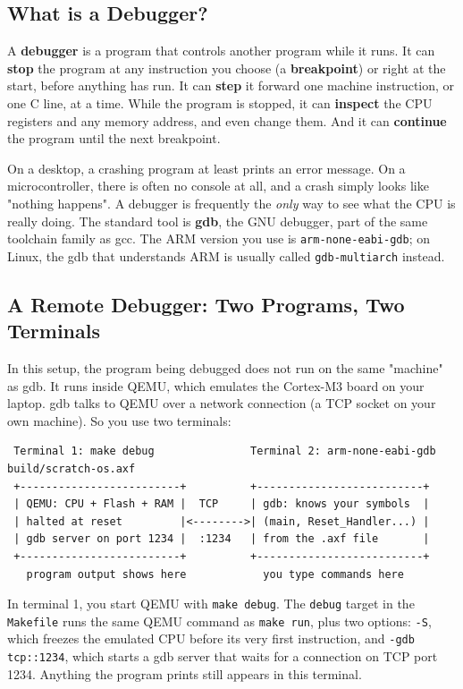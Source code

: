 \subsection{What is a Debugger?}
A \textbf{debugger} is a program that controls another program while it runs. It can \textbf{stop} the program at any instruction you choose (a \textbf{breakpoint}) or right at the start, before anything has run. It can \textbf{step} it forward one machine instruction, or one C line, at a time. While the program is stopped, it can \textbf{inspect} the CPU registers and any memory address, and even change them. And it can \textbf{continue} the program until the next breakpoint.

On a desktop, a crashing program at least prints an error message. On a microcontroller, there is often no console at all, and a crash simply looks like "nothing happens". A debugger is frequently the \textit{only} way to see what the CPU is really doing. The standard tool is \textbf{gdb}, the GNU debugger, part of the same toolchain family as gcc. The ARM version you use is \texttt{arm-none-eabi-gdb}; on Linux, the gdb that understands ARM is usually called \texttt{gdb-multiarch} instead.

\subsection{A Remote Debugger: Two Programs, Two Terminals}
In this setup, the program being debugged does not run on the same "machine" as gdb. It runs inside QEMU, which emulates the Cortex-M3 board on your laptop. gdb talks to QEMU over a network connection (a TCP socket on your own machine). So you use two terminals:

\begin{verbatim}
 Terminal 1: make debug               Terminal 2: arm-none-eabi-gdb build/scratch-os.axf
 +-------------------------+          +--------------------------+
 | QEMU: CPU + Flash + RAM |  TCP     | gdb: knows your symbols  |
 | halted at reset         |<-------->| (main, Reset_Handler...) |
 | gdb server on port 1234 |  :1234   | from the .axf file       |
 +-------------------------+          +--------------------------+
   program output shows here            you type commands here
\end{verbatim}

In terminal 1, you start QEMU with \texttt{make debug}. The \texttt{debug} target in the \texttt{Makefile} runs the same QEMU command as \texttt{make run}, plus two options: \texttt{-S}, which freezes the emulated CPU before its very first instruction, and \texttt{-gdb tcp::1234}, which starts a gdb server that waits for a connection on TCP port 1234. Anything the program prints still appears in this terminal.

